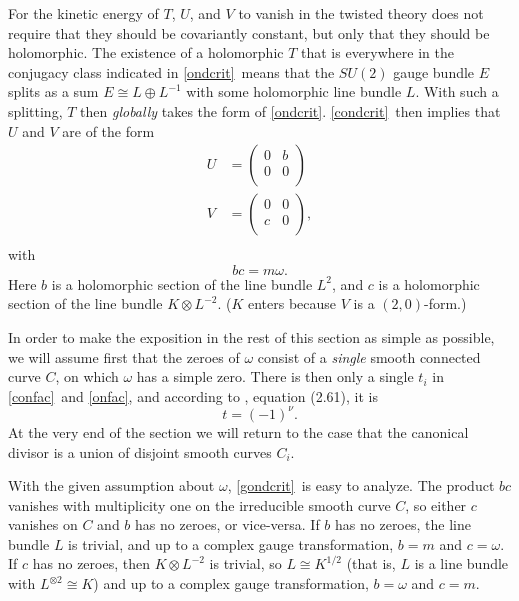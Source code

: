 \documentclass[12pt]{article}
\numberwithin{equation}{section}
\begin{document}
For the kinetic energy of $T$, $U$, and $V$ to vanish in the twisted
theory does not require that they should be covariantly constant,
but only that they should be holomorphic.  The existence of a holomorphic
$T$ that is everywhere in
the conjugacy class indicated in \eqref{ondcrit}\ means that the
$SU(2)$ gauge bundle
$E$ splits as a sum $E\cong L \oplus L^{-1}$ with some holomorphic line
bundle $L$.   With such a splitting, $T$ then {\it globally} takes the form of
\eqref{ondcrit}.  \eqref{condcrit}\ then implies that $U$ and $V$
are of the form
\begin{equation}
  \label{dondcrit}
  \begin{aligned} U& =
    \begin{pmatrix} 0 & b\\ 0 & 0 \\
    \end{pmatrix}\\ V& =
    \begin{pmatrix} 0 & 0 \\ c & 0\\
    \end{pmatrix},\\
  \end{aligned}
\end{equation}
with
\begin{equation}
  \label{gondcrit}
  bc= m\omega.
\end{equation}
Here $b$ is a holomorphic section of the line bundle $L^2$,
and $c$ is a holomorphic section of the line bundle $K\otimes L^{-2}$.
($K$ enters because $V$ is a $(2,0)$-form.)

In order to make the exposition in the rest of this section as simple
as possible, we will assume first that the zeroes of $\omega$ consist
of a {\it single} smooth connected curve $C$, on which $\omega$ has
a simple zero.  There is then only a single $t_i$ in
\eqref{confac}\ and \eqref{onfac},
and according to \cite{switten}, equation (2.61), it is
\begin{equation}
  \label{undod}
  t=(-1)^\nu.
\end{equation}
At the very end of the section we will return to
the case that the canonical divisor is a union of disjoint smooth curves $C_i$.

With the given assumption about $\omega$, \eqref{gondcrit}\ is easy to analyze.
The product $bc$ vanishes with multiplicity one on the irreducible
smooth curve $C$, so either $c$ vanishes on $C$ and $b$ has no zeroes,
or vice-versa.  If $b$ has no zeroes, the line bundle $L$ is trivial, and up
to a complex gauge transformation, $b=m$ and $c=\omega$.
If $c$ has no zeroes, then $K\otimes L^{-2}$ is trivial, so
$L\cong K^{1/2}$  (that is, $L$ is a line bundle with $L^{\otimes 2}\cong K$)
and up to a complex gauge transformation, $b=\omega$
and $c=m$.
\end{document}
